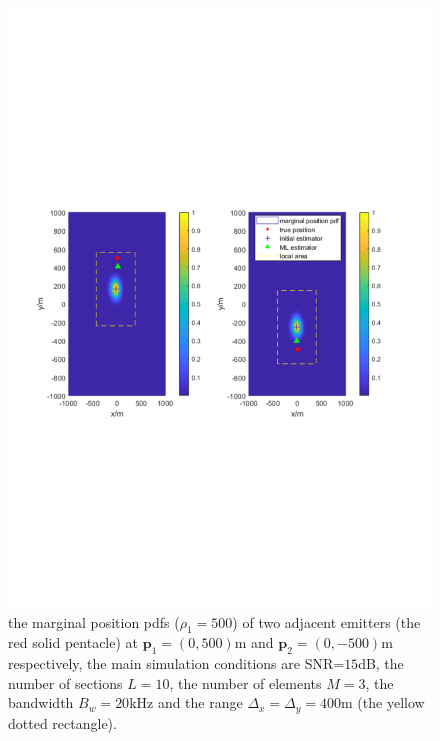 \documentclass[review]{elsarticle}
\begin{document}
\begin{figure}[!t]
    \centerline{\includegraphics[width=1\textwidth]{pdfFigures/toolarge_rho1=500.pdf}}
    \centering
	\caption{the marginal position pdfs ($\rho_1=500$) of two adjacent emitters (the red solid pentacle) at $\boldsymbol{p}_1=(0,500)$m and $\boldsymbol{p}_2=(0,-500)$m respectively, the main simulation conditions are SNR=$15$dB, the number of sections $L=10$, the number of elements $M=3$, the bandwidth $B_w=20$kHz and the range $\Delta_x=\Delta_y=400$m (the yellow dotted rectangle).}\label{fig1}
\end{figure}
\end{document}
